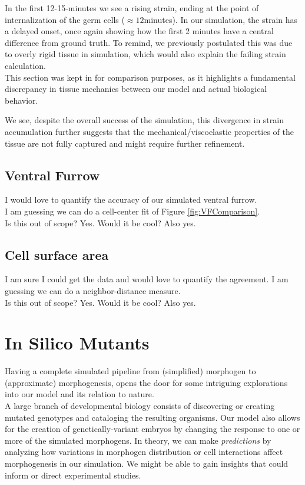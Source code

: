 In the first 12-15-minutes we see a rising strain, ending at the point of internalization of the germ cells ($\approx12$minutes). In our simulation, the strain has a delayed onset, once again showing how the first 2 minutes have a central difference from ground truth. To remind, we previously postulated this was due to overly rigid tissue in simulation, which would also explain the failing strain calculation. \\

This section was kept in for comparison purposes, as it highlights a fundamental discrepancy in tissue mechanics between our model and actual biological behavior.  

We see, despite the overall success of the simulation, this divergence in strain accumulation further suggests that the mechanical/viscoelastic properties of the tissue are not fully captured and might require further refinement. 


\subsection{Ventral Furrow}
I would love to quantify the accuracy of our simulated ventral furrow.\\
I am guessing we can do a cell-center fit of Figure \ref{fig:VFComparison}.\\
Is this out of scope? Yes. Would it be cool? Also yes.

\subsection{Cell surface area}
I am sure I could get the data and would love to quantify the agreement.
I am guessing we can do a neighbor-distance measure.\\
Is this out of scope? Yes. Would it be cool? Also yes.
\newpage
\section{In Silico Mutants}
Having a complete simulated pipeline from (simplified) morphogen to (approximate) morphogenesis, opens the door for some intriguing explorations into our model and its relation to nature. \\

A large branch of developmental biology consists of discovering or creating mutated genotypes and cataloging the resulting organisms. 
Our model also allows for the creation of genetically-variant embryos by changing the response to one or more of the simulated morphogens. In theory, we can make \textit{predictions} by analyzing how variations in morphogen distribution or cell interactions affect morphogenesis in our simulation. We might be able to gain insights that could inform or direct experimental studies.\\


